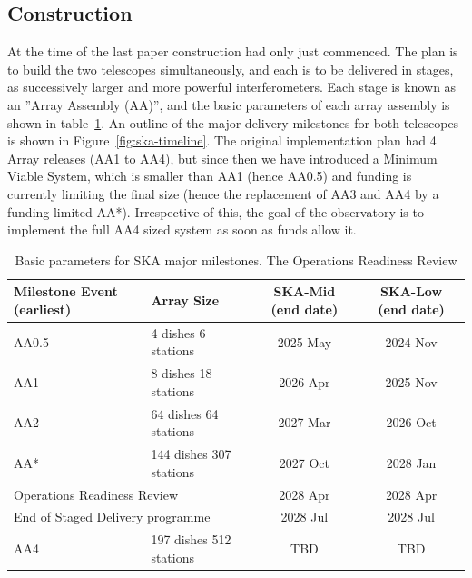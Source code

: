 \documentclass[a4paper,
               biblatex,     %
               keeplastbox,   %
               ]{jacow}
\begin{document}
\subsection{Construction}
At the time of the last paper construction had only just commenced. The plan is to build the two telescopes simultaneously, and each is to be delivered in stages, as successively larger and more powerful interferometers. Each stage is known as an ''Array Assembly (AA)'', and the basic parameters of each array assembly is shown in table~\ref{tab:array-assemblies}. An outline of the major delivery milestones for both telescopes is shown in Figure~\ref{fig:ska-timeline}. The original implementation plan had 4 Array releases (AA1 to AA4), but since then we have introduced a Minimum Viable System, which is smaller than AA1 (hence AA0.5) and funding is currently limiting the final size (hence the replacement of AA3 and AA4 by a funding limited AA*). Irrespective of this, the goal of the observatory is to implement the full AA4 sized system as soon as funds allow it.

\begin{table}[!h]
	\centering
	\caption{Basic parameters for SKA major milestones. The Operations Readiness Review }
        \begin{tabular}{llcc}
            \toprule
            Milestone Event (earliest) & Array Size & SKA-Mid (end date) & SKA-Low (end date)\\
            \midrule
            AA0.5 & 4 dishes 6 stations   & 2025 May & 2024 Nov\\
            AA1   & 8 dishes 18 stations  & 2026 Apr & 2025 Nov\\
            AA2   & 64 dishes 64 stations & 2027 Mar & 2026 Oct\\
            AA* & 144 dishes 307 stations & 2027 Oct & 2028 Jan\\
            \multicolumn{2}{l}{Operations Readiness Review} & 2028 Apr & 2028 Apr\\
            \multicolumn{2}{l}{End of Staged Delivery programme} & 2028 Jul & 2028 Jul\\
            AA4 & 197 dishes 512 stations & TBD & TBD\\
            \bottomrule
        \end{tabular}
	\label{tab:array-assemblies}
 \end{table}
\end{document}
